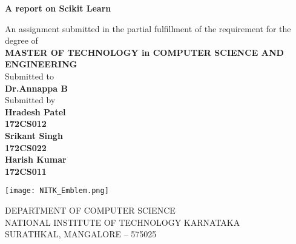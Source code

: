 \documentclass[12pt]{article}
\begin{document}
\begin{titlepage}
        \begin{center}
        
        \Huge
        \textbf{A report on Scikit Learn }
        
        \vspace{0.4cm}
        \large
         
        An assignment submitted in the partial fulfillment of the requirement for the degree of\\ 
        \vspace{0.4cm}
        \textbf{MASTER OF TECHNOLOGY in
COMPUTER SCIENCE AND ENGINEERING
        }\\
        \vspace{0.25cm}
        Submitted to\\
        \textbf{Dr.Annappa B\\}
         \vspace{0.25cm}
        Submitted by\\
        \textbf{Hradesh Patel\\172CS012}\\
         \textbf{Srikant Singh\\172CS022}\\
        \textbf{Harish Kumar\\172CS011}
        
        \vspace{1.55cm}
        
        \texttt{[image: NITK\_Emblem.png]}
    
        \vspace{0.2cm}
        \Large
        DEPARTMENT OF COMPUTER SCIENCE\\
        \vspace{0.4cm}
        NATIONAL INSTITUTE OF TECHNOLOGY KARNATAKA\\
        SURATHKAL, MANGALORE – 575025\\
        \vspace{0.4cm}
        
        
        \end{center}
    \end{titlepage}
\newpage   
\tableofcontents
\newpage
    \listoffigures


        
    
\newpage
\end{document}
